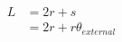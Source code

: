 \documentclass[12pt]{article}
\begin{document}
\begin{align*}
L &= 2r+s \\
  &= 2r+r\theta_{external}
\end{align*}
\end{document}
